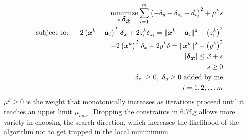 \begin{eqnarray} \label{eq:6.7}
\Min_{s, \Bdelta_{\tilde{\Bx}}} \sum^m_{i=1}\left( -\delta_y + \delta_{z_i} -\tilde{d_i}\right)^2 + \mu^k s \\
\nonumber
\mbox{subject to: }  - 2\left( \Bx^k  - \Ba_i \right)^T\Bdelta_x + 2z_i^k\delta_{z_i}  = \|\Bx^k  - \Ba_i\|^2 - \left(z_i^k\right)^2 \\
\nonumber
-2\left(\Bx^k\right)^T\delta_x + 2y^k\delta = \|\Bx^k\|^2 - \left(y^k\right)^2 \\
\nonumber
|\Bdelta_{\tilde{\Bx}}|  \leq \beta + s\\
\nonumber
s \geq 0 \\ 
\nonumber
\delta_{z_i} \geq 0, \ 
\delta_y \geq 0 \mbox{  added by me}
\\ \nonumber  i = 1, 2, \ldots m
\end{eqnarray}
$\mu^k \geq 0$ is the weight that monotonically increases as iterations proceed until it reaches an upper limit $\mu_{max}$. 
Dropping the constraints in 6.7f,g allows more variety in choosing the search direction, which increases the likelihood of the algorithm not to get trapped in the local minimimum.